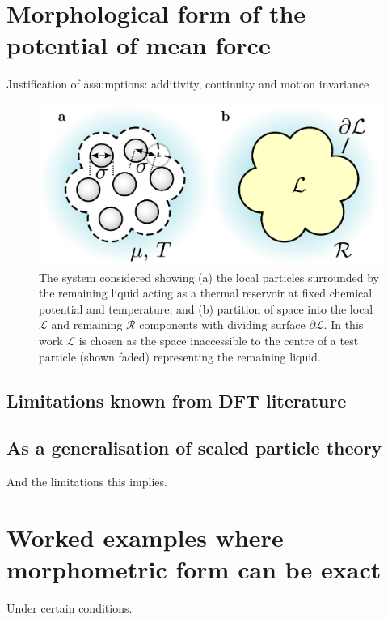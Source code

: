\documentclass[11pt]{report}
\begin{document}

\section{Morphological form of the potential of mean force}
Justification of assumptions: additivity, continuity and motion invariance

\begin{figure}
  \includegraphics[width=\linewidth]{droplet-morph}
  \caption{
    The system considered showing
    (a) the local particles surrounded by the remaining liquid acting as a thermal reservoir at fixed chemical potential and temperature, and
    (b) partition of space into the local $\mathcal{L}$ and remaining $\mathcal{R}$ components with dividing surface $\partial\mathcal{L}$.
    In this work $\mathcal{L}$ is chosen as the space inaccessible to the centre of a test particle (shown faded) representing the remaining liquid.
  }
\end{figure}

\subsection{Limitations known from DFT literature}
\subsection{As a generalisation of scaled particle theory}
And the limitations this implies.

\section{Worked examples where morphometric form can be exact}
Under certain conditions.
\end{document}
